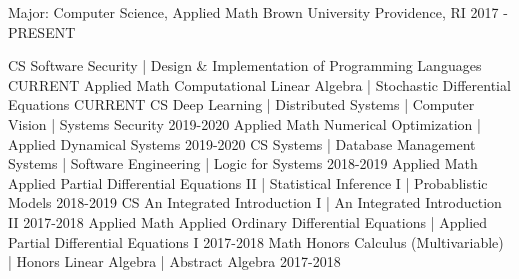 \begin{cventries}
  \cventry
    {Major: Computer Science, Applied Math}
    {Brown University}
    {Providence, RI}
    {2017 - PRESENT}
    {
        \vspace{-2em}
        \begin{cvhonors}
			\cvhonor
			{CS}
            {Software Security | Design \& Implementation of Programming Languages}
			{}
            {CURRENT}
			\cvhonor
			{Applied Math}
            {Computational Linear Algebra | Stochastic Differential Equations}
			{}
            {CURRENT}
			\cvhonor
			{CS}
            {Deep Learning | Distributed Systems | Computer Vision | Systems Security}
			{}
			{2019-2020}
			\cvhonor
			{Applied Math}
			{Numerical Optimization | Applied Dynamical Systems}
			{}
			{2019-2020}
			\cvhonor
			{CS}
			{Systems | Database Management Systems | Software Engineering | Logic for Systems}
			{}
			{2018-2019}
			\cvhonor
			{Applied Math}
            {Applied Partial Differential Equations II | Statistical Inference I | Probablistic Models}
			{}
			{2018-2019}
			\cvhonor
			{CS}
			{An Integrated Introduction I | An Integrated Introduction II}
			{}
			{2017-2018}
			\cvhonor
			{Applied Math}
			{Applied Ordinary Differential Equations | Applied Partial Differential Equations I}
			{}
			{2017-2018}
			\cvhonor
			{Math}
			{Honors Calculus (Multivariable) | Honors Linear Algebra | Abstract Algebra}
			{}
			{2017-2018}
        \end{cvhonors}
		\vspace{-1.25em}
    }
\end{cventries}


